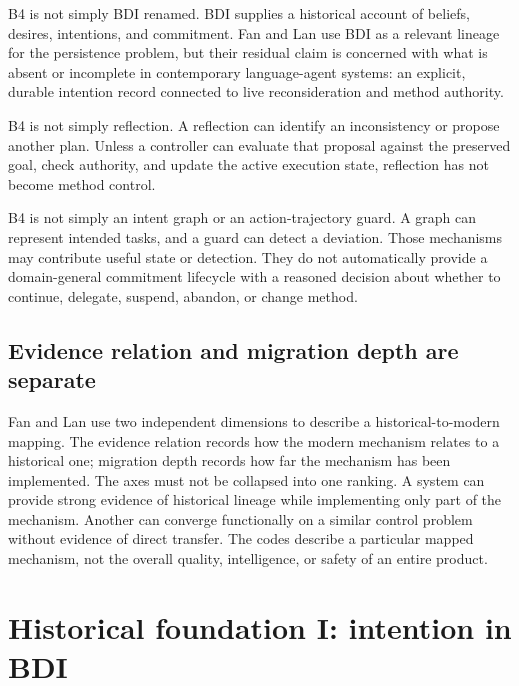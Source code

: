 B4 is not simply BDI renamed. BDI supplies a historical account of beliefs, desires, intentions, and commitment. Fan and Lan use BDI as a relevant lineage for the persistence problem, but their residual claim is concerned with what is absent or incomplete in contemporary language-agent systems: an explicit, durable intention record connected to live reconsideration and method authority.

B4 is not simply reflection. A reflection can identify an inconsistency or propose another plan. Unless a controller can evaluate that proposal against the preserved goal, check authority, and update the active execution state, reflection has not become method control.

B4 is not simply an intent graph or an action-trajectory guard. A graph can represent intended tasks, and a guard can detect a deviation. Those mechanisms may contribute useful state or detection. They do not automatically provide a domain-general commitment lifecycle with a reasoned decision about whether to continue, delegate, suspend, abandon, or change method.

\subsection{Evidence relation and migration depth are separate}

Fan and Lan use two independent dimensions to describe a historical-to-modern mapping. The evidence relation records how the modern mechanism relates to a historical one; migration depth records how far the mechanism has been implemented. The axes must not be collapsed into one ranking. A system can provide strong evidence of historical lineage while implementing only part of the mechanism. Another can converge functionally on a similar control problem without evidence of direct transfer. The codes describe a particular mapped mechanism, not the overall quality, intelligence, or safety of an entire product.


\section{Historical foundation I: intention in BDI}
\label{sec:ch15-bdi}

